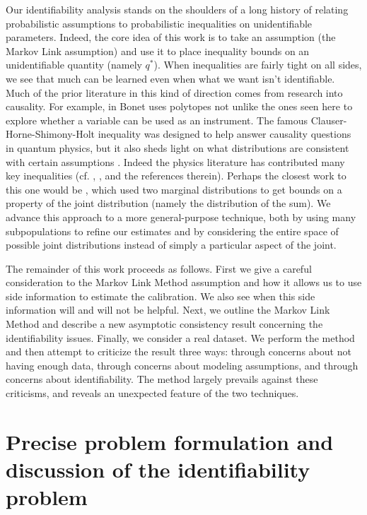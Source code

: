 Our identifiability analysis stands on the shoulders of a long history of relating probabilistic assumptions to probabilistic inequalities on unidentifiable parameters.  Indeed, the core idea of this work is to take an assumption (the Markov Link assumption) and use it to place inequality bounds on an unidentifiable quantity (namely $q^*$).  When inequalities are fairly tight on all sides, we see that much can be learned even when what we want isn't identifiable.  Much of the prior literature in this kind of direction comes from research into causality.  For example, in \cite{bonet2001instrumentality} Bonet uses polytopes not unlike the ones seen here to explore whether a variable can be used as an instrument.  The famous Clauser-Horne-Shimony-Holt inequality was designed to help answer causality questions in quantum physics, but it also sheds light on what distributions are consistent with certain assumptions \cite{clauser1969proposed}.  Indeed the physics literature has contributed many key inequalities (cf. \cite{chaves2014inferring}, \cite{kela2017semidefinite}, and the references therein).  Perhaps the closest work to this one would be \cite{makarov1982estimates}, which used two marginal distributions to get bounds on a property of the joint distribution (namely the distribution of the sum).  We advance this approach to a more general-purpose technique, both by using many subpopulations to refine our estimates and by considering the entire space of possible joint distributions instead of simply a particular aspect of the joint.  

The remainder of this work proceeds as follows.  First we give a careful consideration to the Markov Link Method assumption and how it allows us to use side information to estimate the calibration.  We also see when this side information will and will not be helpful.  Next, we outline the Markov Link Method and describe a new asymptotic consistency result concerning the identifiability issues.   Finally, we consider a real dataset.  We perform the method and then attempt to criticize the result three ways: through concerns about not having enough data, through concerns about modeling assumptions, and through concerns about identifiability.  The method largely prevails against these criticisms, and reveals an unexpected feature of the two techniques. 

\section{Precise problem formulation and discussion of the identifiability problem}

